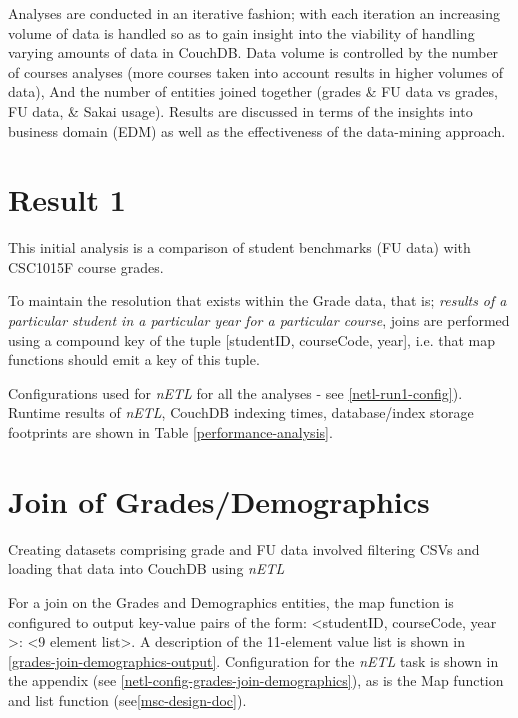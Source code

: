 Analyses are conducted in an iterative fashion; with each iteration an increasing volume of data is handled so as to gain insight into the viability of handling varying amounts of data in CouchDB. Data volume is controlled by the number of courses analyses (more courses taken into account results in higher volumes of data), And the number of entities joined together (grades \& FU data vs grades, FU data, \& Sakai usage). Results are discussed in terms of the insights into business domain (EDM) as well as the effectiveness of the data-mining approach.

\section{Result 1}
This initial analysis is a comparison of student benchmarks (FU data) with CSC1015F course grades.






To maintain the resolution that exists within the Grade data, that is; \textit{results of a particular student in a particular year for a particular course}, joins are performed using a compound key of the tuple [studentID, courseCode, year], i.e. that map functions should emit a key of this tuple.







Configurations used for \textit{nETL} for all the analyses - see \ref{netl-run1-config}). Runtime results of \textit{nETL}, CouchDB indexing times, database/index storage footprints are shown in Table \ref{performance-analysis}.



\section{Join of Grades/Demographics}
Creating datasets comprising grade and FU data involved filtering CSVs and loading that data into CouchDB using \textit{nETL}

For a join on the Grades and Demographics entities, the map function is configured to output key-value pairs of the form: \textless studentID, courseCode, year \textgreater : <9 element list>. A description of the 11-element value list is shown in \ref{grades-join-demographics-output}. Configuration for the \textit{nETL} task is shown in the appendix (see \ref{netl-config-grades-join-demographics}), as is the Map function and list function (see\ref{msc-design-doc}).

